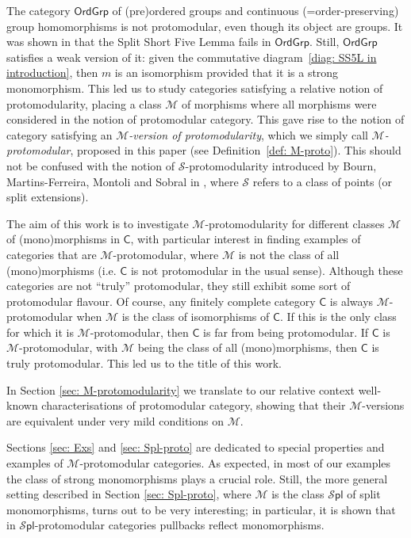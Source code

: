 \documentclass[11pt]{amsart}
\theoremstyle{plain}
\theoremstyle{definition}
\theoremstyle{remark}
\newcommand{\defn}[1]{\emph{#1}}
\newcommand{\C}{\ensuremath{\mathsf{C}}}
\newcommand{\Grp}{\ensuremath{\mathsf{Grp}}}
\newcommand{\Ord}{\ensuremath{\mathsf{Ord}}}
\newcommand{\M}{\ensuremath{\mathscr{M}}}
\newcommand{\Sscr}{\ensuremath{\mathscr{S}}}
\newcommand{\OrdGrp}{\ensuremath{\mathsf{OrdGrp}}}
\newcommand{\Spl}{\ensuremath{\mathscr{S}\mathsf{pl}}}
\begin{document}
The category $\Ord\Grp$ of (pre)ordered groups and continuous (=order-preserving) group homomorphisms is not protomodular, even though its object are groups. It was shown in \cite{CM-FM} that the Split Short Five Lemma fails in $\OrdGrp$. Still, $\OrdGrp$ satisfies a weak version of it: given the commutative diagram~\eqref{diag: SS5L in introduction}, then $m$ is an isomorphism provided that it is a strong monomorphism. This led us to study categories satisfying a relative notion of protomodularity, placing a class $\M$ of morphisms where all morphisms were considered in the notion of protomodular category. This gave rise to the notion of category satisfying an \defn{$\M$-version of protomodularity}, which we simply call \defn{$\M$-protomodular}, proposed in this paper (see Definition~\ref{def: M-proto}). This should not be confused with the notion of $\Sscr$-protomodularity introduced by Bourn, Martins-Ferreira, Montoli and Sobral in \cite{BMFMS}, where $\Sscr$ refers to a class of points (or split extensions).

The aim of this work is to investigate $\M$-protomodularity for different classes $\M$ of (mono)mor\-phi\-sms in $\C$, with particular interest in finding examples of categories that are $\M$-protomodular, where $\M$ is not the class of all (mono)morphisms (i.e. $\C$ is not protomodular in the usual sense). Although these categories are not ``truly'' protomodular, they still exhibit some sort of protomodular flavour. Of course, any finitely complete category $\C$ is always $\M$-protomodular when $\M$ is the class of isomorphisms of $\C$. If this is the only class for which it is $\M$-protomodular, then $\C$ is far from being protomodular. If $\C$ is $\M$-protomodular, with $\M$ being the class of all (mono)morphisms, then $\C$ is truly protomodular. This led us to the title of this work.


In Section \ref{sec: M-protomodularity} we translate to our relative context well-known characterisations of protomodular category, showing that their $\M$-versions are equivalent under very mild conditions on $\M$.


Sections \ref{sec: Exs} and \ref{sec: Spl-proto} are dedicated to special properties and examples of $\M$-protomodular categories. As expected, in most of our examples the class of strong monomorphisms plays a crucial role. Still, the more general setting described in Section \ref{sec: Spl-proto}, where $\M$ is the class $\Spl$ of split monomorphisms, turns out to be very interesting; in particular, it is shown that in $\Spl$-protomodular categories pullbacks reflect monomorphisms.
\end{document}
